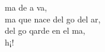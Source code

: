\begin{cancion}%
	ma de a va,\\
	ma que nace del go del ar,\\
	del go qarde en el ma,\\
	h¡! \\
\end{cancion}%
